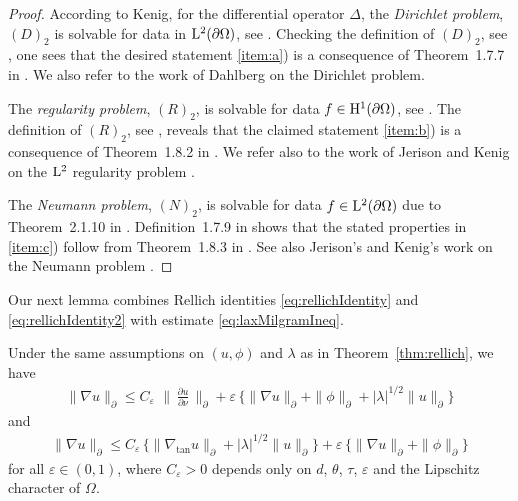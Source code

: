 \begin{proof}
  According to Kenig, for the differential operator $\Delta$, the \emph{Dirichlet problem}, $(D)_2$ is solvable for data in $\mathrm{L}^2(\partial\Omega)$, see \cite[Thm.\@~2.1.5]{kenigBook}.
  Checking the definition of $(D)_2$, see \cite[Defn.\@~1.7.4]{kenigBook}, one sees that the desired statement \ref{item:a}) is a consequence of Theorem~1.7.7 in \cite{kenigBook}.
  We also refer to the work of Dahlberg \cite{dahlberg} on the Dirichlet problem.

  The \emph{regularity problem}, $(R)_2$, is solvable for data $f \in \mathrm{H}^1(\partial\Omega)$, see \cite[Thm.\@~2.1.10]{kenigBook}.
  The definition of $(R)_2$, see \cite[Defn.\@~1.7.4]{kenigBook}, reveals that the claimed statement \ref{item:b}) is a consequence of Theorem~1.8.2 in \cite{kenigBook}. 
  We refer also to the work of Jerison and Kenig on the $\mathrm{L}^2$ regularity problem \cite{jerisonKenig2}.

  The \emph{Neumann problem}, $(N)_2$, is solvable for data $f \in \mathrm{L}^2(\partial\Omega)$ due to Theorem~2.1.10 in \cite{kenigBook}.
  Definition~1.7.9 in \cite{kenigBook} shows that the stated properties in \ref{item:c}) follow from Theorem~1.8.3 in \cite{kenigBook}.
  See also Jerison's and Kenig's work on the Neumann problem \cite{jerisonKenig}.
\end{proof}

Our next lemma combines Rellich identities \eqref{eq:rellichIdentity} and \eqref{eq:rellichIdentity2} with estimate \eqref{eq:laxMilgramIneq}.

\begin{lem}
  Under the same assumptions on $(u,\phi)$ and $\lambda$ as in Theorem~\ref{thm:rellich}, we have
  \begin{align}
    \label{eq:gradEstimateRellich}
    \| \nabla u\|^{}_\partial \leq C_\varepsilon\, \,\Big\|\, \frac{\partial u}{\partial \nu} \, \Big\|^{}_\partial + \varepsilon \,\Big\{ \|\nabla u\|^{}_\partial + \|\phi\|^{}_\partial +  |\lambda|^{1/2} \| u\|^{}_\partial \Big\}
  \end{align}
  and
  \begin{align}
    \label{eq:gradEstimateRellich2}
    \|\nabla u\|^{}_\partial \leq C_\varepsilon\, \Big\{ \big\|\nabla_{\mathrm{tan}} u \big\|^{}_\partial + |\lambda|^{1/2} \| u\|^{}_\partial \Big\} + \varepsilon\, \Big\{ \|\nabla u\|^{}_\partial + \|\phi\|^{}_\partial \Big\}
  \end{align}
  for all $\varepsilon \in (0,1)$, where $C_\varepsilon > 0$ depends only on $d$, $\theta$, $\tau$, $\varepsilon$ and the Lipschitz character of $\Omega$.
\end{lem}

